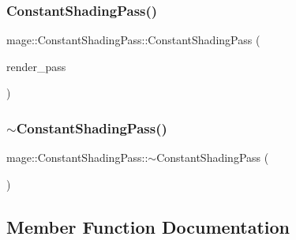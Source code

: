 \subsubsection{\texorpdfstring{Constant\+Shading\+Pass()}{ConstantShadingPass()}\hspace{0.1cm}{\footnotesize\ttfamily [3/3]}}
{\footnotesize\ttfamily mage\+::\+Constant\+Shading\+Pass\+::\+Constant\+Shading\+Pass (\begin{DoxyParamCaption}\item[{\hyperlink{classmage_1_1_constant_shading_pass}{Constant\+Shading\+Pass} \&\&}]{render\+\_\+pass }\end{DoxyParamCaption})\hspace{0.3cm}{\ttfamily [default]}}

\hypertarget{classmage_1_1_constant_shading_pass_a2ef56dc45910519d5e0137b14768738e}{}\label{classmage_1_1_constant_shading_pass_a2ef56dc45910519d5e0137b14768738e} 
\subsubsection{\texorpdfstring{$\sim$\+Constant\+Shading\+Pass()}{~ConstantShadingPass()}}
{\footnotesize\ttfamily mage\+::\+Constant\+Shading\+Pass\+::$\sim$\+Constant\+Shading\+Pass (\begin{DoxyParamCaption}{ }\end{DoxyParamCaption})\hspace{0.3cm}{\ttfamily [default]}}



\subsection{Member Function Documentation}
\hypertarget{classmage_1_1_constant_shading_pass_a3a7137609e3b949735556458d2cd803d}{}\label{classmage_1_1_constant_shading_pass_a3a7137609e3b949735556458d2cd803d} 
